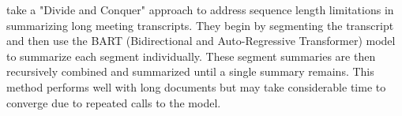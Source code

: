 \citet{golia2024action} take a "Divide and Conquer" approach to address sequence length limitations in summarizing long meeting transcripts.
They begin by segmenting the transcript and then use the BART (Bidirectional and Auto-Regressive Transformer) \cite{lewis-etal-2020-bart} model to summarize each segment individually.
These segment summaries are then recursively combined and summarized until a single summary remains.
This method performs well with long documents but may take considerable time to converge due to repeated calls to the model.
